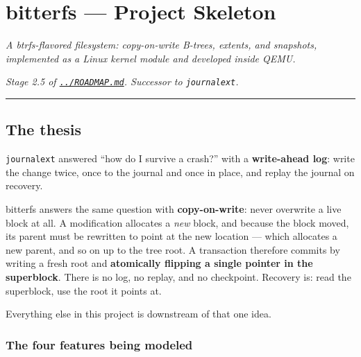 \hypertarget{bitterfs-project-skeleton}{%
\chapter{bitterfs --- Project Skeleton}\label{bitterfs-project-skeleton}}

\emph{A btrfs-flavored filesystem: copy-on-write B-trees, extents, and snapshots,
implemented as a Linux kernel module and developed inside QEMU.}

\emph{Stage 2.5 of \href{../ROADMAP.md}{\texttt{../ROADMAP.md}}. Successor to \texttt{journalext}.}

\begin{center}\rule{0.5\linewidth}{0.5pt}\end{center}

\hypertarget{the-thesis}{%
\section{The thesis}\label{the-thesis}}

\texttt{journalext} answered ``how do I survive a crash?'' with a \textbf{write-ahead log}: write the
change twice, once to the journal and once in place, and replay the journal on recovery.

bitterfs answers the same question with \textbf{copy-on-write}: never overwrite a live block
at all. A modification allocates a \emph{new} block, and because the block moved, its parent
must be rewritten to point at the new location --- which allocates a new parent, and so on
up to the tree root. A transaction therefore commits by writing a fresh root and
\textbf{atomically flipping a single pointer in the superblock}. There is no log, no replay,
and no checkpoint. Recovery is: read the superblock, use the root it points at.

Everything else in this project is downstream of that one idea.

\hypertarget{the-four-features-being-modeled}{%
\subsection{The four features being modeled}\label{the-four-features-being-modeled}}

